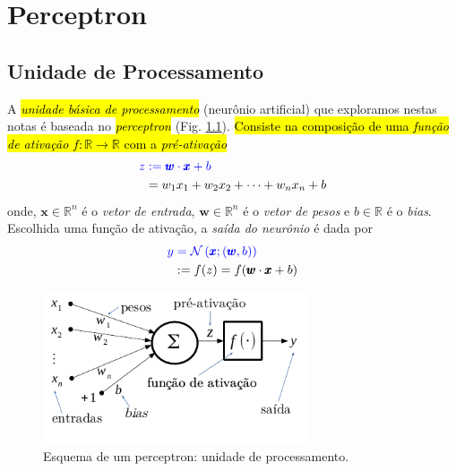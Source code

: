 
\chapter{Perceptron}\label{cap_perceptron}
\thispagestyle{fancy}


\section{Unidade de Processamento}\label{cap_perceptron_sec_unit}

A \hl{\emph{unidade básica de processamento}} (neurônio artificial) que exploramos nestas notas é baseada no \hl{\emph{perceptron}} (Fig. \ref{fig:perceptron}). \hl{Consiste na composição de uma \emph{função de ativação} $f:\mathbb{R}\to\mathbb{R}$ com a \emph{pré-ativação}}
\begin{align}
  \color{blue}z &\color{blue}:= \pmb{w}\cdot\pmb{x} + b \\
           &= w_1x_1 + w_2x_2 + \cdots + w_nx_n + b
\end{align}
onde, $\pmb{x}\in\mathbb{R}^{n}$ é o \emph{vetor de entrada}, $\pmb{w}\in\mathbb{R}^{n}$ é o \emph{vetor de pesos} e $b\in\mathbb{R}$ é o \emph{\textit{bias}}. Escolhida uma função de ativação, a \emph{saída do neurônio} é dada por
\begin{align}
  \color{blue}y &\color{blue}= \mathcal{N}\left(\pmb{x}; (\pmb{w},b)\right)\\
    &:= f(z) = f(\pmb{w}\cdot\pmb{x} + b)
\end{align}

\begin{figure}[H]
  \centering
  \includegraphics[width=0.7\textwidth]{./cap_perceptron/dados/fig_perceptron/fig}
  \caption{Esquema de um perceptron: unidade de processamento.}
  \label{fig:perceptron}
\end{figure}

